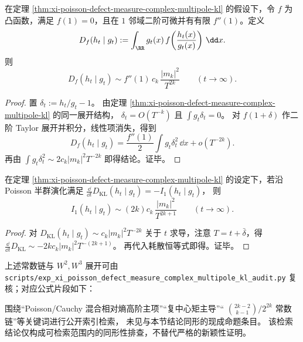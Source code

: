 \begin{proposition}\label{prop:xi-poisson-defect-measure-fdiv-multipole}
在定理 \ref{thm:xi-poisson-defect-measure-complex-multipole-kl} 的假设下，令 \(f\) 为凸函数，满足 \(f(1)=0\)，且在 \(1\) 邻域二阶可微并有有限 \(f''(1)\)。定义
\[
D_f(h_t\mid g_t):=\int_{\RR}g_t(x)\,
f\!\left(\frac{h_t(x)}{g_t(x)}\right)\,\dd x.
\]
则
\[
D_f(h_t\mid g_t)\sim f''(1)\,c_k\,\frac{|m_k|^2}{T^{2k}}
\qquad(t\to\infty).
\]
\end{proposition}
\begin{proof}
置 \(\delta_t:=h_t/g_t-1\)。
由定理 \ref{thm:xi-poisson-defect-measure-complex-multipole-kl} 的同一展开结构，
\(
\delta_t=O(T^{-k})
\)
且
\(
\int g_t\delta_t=0
\)。
对 \(f(1+\delta)\) 作二阶 Taylor 展开并积分，线性项消失，得到
\[
D_f(h_t\mid g_t)=\frac{f''(1)}{2}\int g_t\delta_t^2\,\dd x+o(T^{-2k}).
\]
再由
\(
\int g_t\delta_t^2\sim 2c_k|m_k|^2T^{-2k}
\)
即得结论。证毕。
\end{proof}

\begin{corollary}[信息耗散量的全阶主常数]\label{cor:xi-poisson-defect-measure-i1-multipole}
在定理 \ref{thm:xi-poisson-defect-measure-complex-multipole-kl} 的设定下，若沿 Poisson 半群演化满足
\(
\frac{\dd}{\dd t}D_{\mathrm{KL}}(h_t\mid g_t)=-I_1(h_t\mid g_t)
\)，
则
\[
I_1(h_t\mid g_t)\sim (2k)c_k\,\frac{|m_k|^2}{T^{2k+1}}
\qquad(t\to\infty).
\]
\end{corollary}
\begin{proof}
对
\(
D_{\mathrm{KL}}(h_t\mid g_t)\sim c_k|m_k|^2T^{-2k}
\)
关于 \(t\) 求导，注意 \(T=t+\bar\delta\)，得
\(
\frac{\dd}{\dd t}D_{\mathrm{KL}}\sim -2kc_k|m_k|^2T^{-(2k+1)}
\)。
再代入耗散恒等式即得。证毕。
\end{proof}

\begin{remark}[复多极常数链与核验片段]\label{rem:xi-poisson-defect-measure-complex-multipole-audit-snippet}
上述常数链与 \(W^2,W^3\) 展开可由
\texttt{scripts/exp\_xi\_poisson\_defect\_measure\_complex\_multipole\_kl\_audit.py}
复核；对应公式片段如下：

\end{remark}

\begin{remark}[公开索引同形性检索说明]\label{rem:xi-poisson-defect-measure-complex-multipole-public-index-check}
围绕“Poisson/Cauchy 混合相对熵高阶主项”“复中心矩主导”“
\(\binom{2k-2}{k-1}/2^{2k}\) 常数链”等关键词进行公开索引检索，
未见与本节结论同形的现成命题条目。
该检索结论仅构成可检索范围内的同形性排查，不替代严格的新颖性证明。
\end{remark}

\endinput

